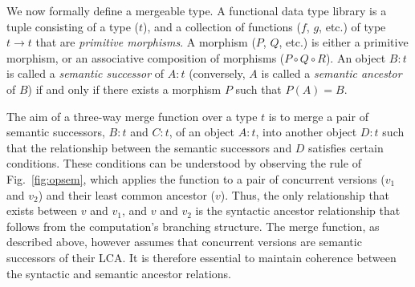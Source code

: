 We now formally define a mergeable type.  A functional data type
library is a tuple consisting of a type ($t$), and a collection of
functions ($f$, $g$, etc.) of type $t \rightarrow t$ that are
\emph{primitive morphisms}. A morphism ($P$, $Q$, etc.) is either a
primitive morphism, or an associative composition of morphisms ($P
\circ Q \circ R$). An object $B:t$ is called a \emph{semantic
successor} of $A:t$ (conversely, $A$ is called a \emph{semantic
ancestor} of $B$) if and only if there exists a morphism $P$ such that
$P(A) = B$.

The aim of a three-way merge function over a type $t$ is to merge a
pair of semantic successors, $B:t$ and $C:t$, of an object $A:t$, into
another object $D:t$ such that the relationship between the semantic
successors and $D$ satisfies certain conditions. These conditions can
be understood by observing the  rule of
Fig.~\ref{fig:opsem}, which applies the  function to a pair
of concurrent versions ($v_1$ and $v_2$) and their least common
ancestor ($v$). Thus, the only relationship that exists between $v$
and $v_1$, and $v$ and $v_2$ is the syntactic ancestor relationship
that follows from the computation's branching structure. The merge
function, as described above, however assumes that concurrent versions
are semantic successors of their LCA.  It is therefore essential to
maintain coherence between the syntactic and semantic ancestor
relations.

